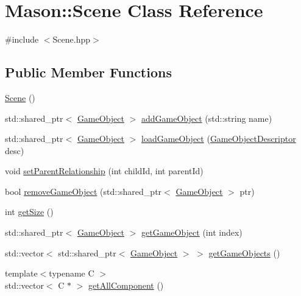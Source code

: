 \hypertarget{class_mason_1_1_scene}{}\section{Mason\+:\+:Scene Class Reference}
\label{class_mason_1_1_scene}


{\ttfamily \#include $<$Scene.\+hpp$>$}

\subsection*{Public Member Functions}
\begin{DoxyCompactItemize}
\item 
\hyperlink{class_mason_1_1_scene_a31b9509898769d98c7230ac78b95059d}{Scene} ()
\item 
std\+::shared\+\_\+ptr$<$ \hyperlink{class_mason_1_1_game_object}{Game\+Object} $>$ \hyperlink{class_mason_1_1_scene_afe8ac9cb371c04a0587faf06bf828ac9}{add\+Game\+Object} (std\+::string name)
\item 
std\+::shared\+\_\+ptr$<$ \hyperlink{class_mason_1_1_game_object}{Game\+Object} $>$ \hyperlink{class_mason_1_1_scene_a4d1afc4d112079aedd3829a8a42e902e}{load\+Game\+Object} (\hyperlink{class_mason_1_1_game_object_descriptor}{Game\+Object\+Descriptor} desc)
\item 
void \hyperlink{class_mason_1_1_scene_a2d10aca9d364dc70935795a1436f353d}{set\+Parent\+Relationship} (int child\+Id, int parent\+Id)
\item 
bool \hyperlink{class_mason_1_1_scene_aad5427fcdd330f65dc4e7b1e627afce4}{remove\+Game\+Object} (std\+::shared\+\_\+ptr$<$ \hyperlink{class_mason_1_1_game_object}{Game\+Object} $>$ ptr)
\item 
int \hyperlink{class_mason_1_1_scene_a97780dbb825e92c62b02623fe1e297fa}{get\+Size} ()
\item 
std\+::shared\+\_\+ptr$<$ \hyperlink{class_mason_1_1_game_object}{Game\+Object} $>$ \hyperlink{class_mason_1_1_scene_ae13738888d4f00135fb827639f87239b}{get\+Game\+Object} (int index)
\item 
std\+::vector$<$ std\+::shared\+\_\+ptr$<$ \hyperlink{class_mason_1_1_game_object}{Game\+Object} $>$ $>$ \hyperlink{class_mason_1_1_scene_a045d786fa6f11ab01e190971637b15ce}{get\+Game\+Objects} ()
\item 
{\footnotesize template$<$typename C $>$ }\\std\+::vector$<$ C $\ast$ $>$ \hyperlink{class_mason_1_1_scene_a889caa86c1c4c8fad9416c7240148232}{get\+All\+Component} ()
\end{DoxyCompactItemize}

